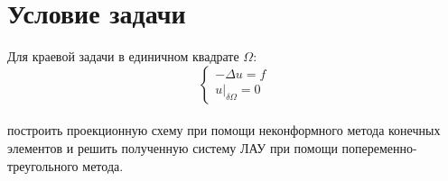 \documentclass[12pt, a4paper]{article}
\begin{document}
	
	
	\section{Условие задачи}
	\vspace{0.5cm}
	Для краевой задачи в единичном квадрате $\Omega$: \\
	\begin{equation*}
		\begin{cases}
			-\Delta u = f \\
			u|_{\delta \Omega} = 0
   		\end{cases}
 	\end{equation*} \\
 	построить проекционную схему при помощи неконформного метода конечных элементов и решить
 	полученную систему ЛАУ при помощи попеременно-треугольного метода.
 	
\end{document}
